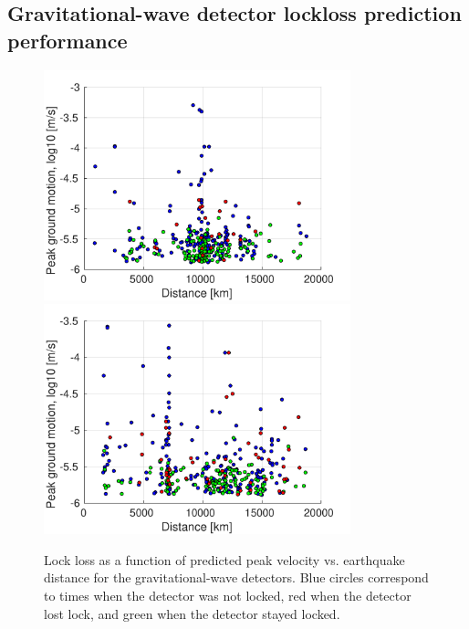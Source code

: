 \documentclass[reprint, prl, aps, showpacs]{revtex4-1}
\begin{document}
\subsection{Gravitational-wave detector lockloss prediction performance}

\begin{figure}[t]
\hspace*{-0.5cm}
 \includegraphics[width=3.5in]{lockloss_vel_distance_LHO.pdf}
  \includegraphics[width=3.5in]{lockloss_vel_distance_LLO.pdf}
 \caption{Lock loss as a function of predicted peak velocity vs. earthquake distance for the gravitational-wave detectors. Blue circles correspond to times when the detector was not locked, red when the detector lost lock, and green when the detector stayed locked.}
 \label{fig:lockloss}
\end{figure}
\end{document}
